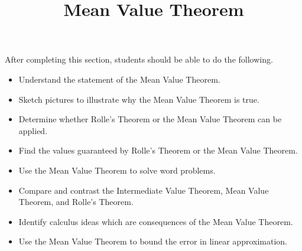 \documentclass{ximera}
\title{Mean Value Theorem}
\begin{document}
\begin{abstract}
\end{abstract}

\maketitle

\begin{sectionOutcomes}

After completing this section, students should be able to do the following.

\begin{itemize}
	\item Understand the statement of the Mean Value Theorem.
	\item Sketch pictures to illustrate why the Mean Value Theorem is true.
	\item Determine whether Rolle's Theorem or the Mean Value Theorem can be applied.
	\item Find the values guaranteed by Rolle's Theorem or the Mean Value Theorem.
	\item Use the Mean Value Theorem to solve word problems.
	\item Compare and contrast the Intermediate Value Theorem, Mean Value Theorem, and Rolle's Theorem.
	\item Identify calculus ideas which are consequences of the Mean Value Theorem.
        \item Use the Mean Value Theorem to bound the error in linear approximation.
\end{itemize}

\end{sectionOutcomes}
\end{document}
